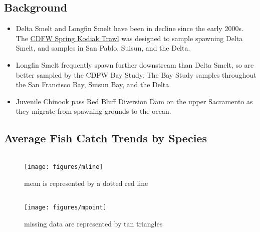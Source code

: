 \documentclass[
]{book}
\providecommand{\tightlist}{%
  \setlength{\itemsep}{0pt}\setlength{\parskip}{0pt}}
\begin{document}
\hypertarget{background-5}{%
\subsection{Background}\label{background-5}}

\begin{itemize}
\tightlist
\item
  Delta Smelt and Longfin Smelt have been in decline since the early 2000s. The \href{https://www.wildlife.ca.gov/Conservation/Delta/Spring-Kodiak-Trawl}{CDFW Spring Kodiak Trawl} was designed to sample spawning Delta Smelt, and samples in San Pablo, Suisun, and the Delta.
\item
  Longfin Smelt frequently spawn further downstream than Delta Smelt, so are better sampled by the CDFW Bay Study. The Bay Study samples throughout the San Francisco Bay, Suisun Bay, and the Delta.
\item
  Juvenile Chinook pass Red Bluff Diversion Dam on the upper Sacramento as they migrate from spawning grounds to the ocean.
\end{itemize}

\hypertarget{average-fish-catch-trends-by-species-1}{%
\subsection{Average Fish Catch Trends by Species}\label{average-fish-catch-trends-by-species-1}}

\begin{columns-nocenter}

\begin{column}

\begin{figure}
\texttt{[image: figures/mline]} \caption{mean is represented by a dotted red line}\label{fig:unnamed-chunk-177}
\end{figure}

\end{column}

\begin{column}

\begin{figure}
\texttt{[image: figures/mpoint]} \caption{missing data are represented by tan triangles}\label{fig:unnamed-chunk-178}
\end{figure}

\end{column}

\begin{column}

\end{column}

\end{columns-nocenter}
\end{document}
